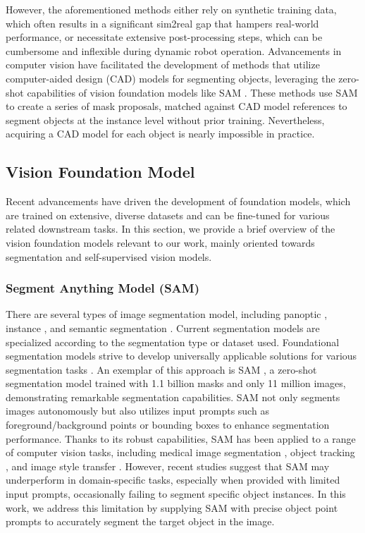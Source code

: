 However, the aforementioned methods either rely on synthetic training data, which often results in a significant sim2real gap that hampers real-world performance, or necessitate extensive post-processing steps, which can be cumbersome and inflexible during dynamic robot operation. Advancements in computer vision have facilitated the development of methods \cite{chen20233d, nguyen2023cnos} that utilize computer-aided design (CAD) models for segmenting objects, leveraging the zero-shot capabilities of vision foundation models like SAM \cite{kirillov2023segment}. These methods use SAM to create a series of mask proposals, matched against CAD model references to segment objects at the instance level without prior training. Nevertheless, acquiring a CAD model for each object is nearly impossible in practice.

\subsection{Vision Foundation Model}
Recent advancements have driven the development of foundation models, which are trained on extensive, diverse datasets and can be fine-tuned for various related downstream tasks. In this section, we provide a brief overview of the vision foundation models relevant to our work, mainly oriented towards segmentation and self-supervised vision models.
\subsubsection{Segment Anything Model (SAM)}
There are several types of image segmentation model, including panoptic \cite{kirillov2019panoptic}, instance \cite{bolya2019yolact}, and semantic segmentation \cite{long2015fully}. Current segmentation models are specialized according to the segmentation type or dataset used. Foundational segmentation models strive to develop universally applicable solutions for various segmentation tasks \cite{awais2023foundational}. An exemplar of this approach is SAM \cite{kirillov2023segment}, a zero-shot segmentation model trained with 1.1 billion masks and only 11 million images, demonstrating remarkable segmentation capabilities. SAM not only segments images autonomously but also utilizes input prompts such as foreground/background points or bounding boxes to enhance segmentation performance. Thanks to its robust capabilities, SAM has been applied to a range of computer vision tasks, including medical image segmentation \cite{he2023accuracy}, object tracking \cite{cheng2023segment}, and image style transfer \cite{yu2023inpaint}. However, recent studies \cite{cui2023all,zhang2023uvosam} suggest that SAM may underperform in domain-specific tasks, especially when provided with limited input prompts, occasionally failing to segment specific object instances. In this work, we address this limitation by supplying SAM with precise object point prompts to accurately segment the target object in the image.
